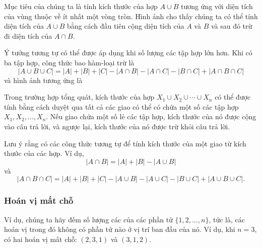 Mục tiêu của chúng ta là tính
kích thước của hợp $A \cup B$
tương ứng với diện tích của vùng
thuộc về ít nhất một vòng tròn.
Hình ảnh cho thấy chúng ta có thể tính
diện tích của $A \cup B$ bằng cách đầu tiên cộng
diện tích của $A$ và $B$ và sau đó trừ đi
diện tích của $A \cap B$.

Ý tưởng tương tự có thể được áp dụng khi số lượng
các tập hợp lớn hơn.
Khi có ba tập hợp, công thức bao hàm-loại trừ là
\[ |A \cup B \cup C| = |A| + |B| + |C| - |A \cap B|  - |A \cap C|  - |B \cap C| + |A \cap B \cap C| \]
và hình ảnh tương ứng là

\begin{center}
\end{center}

Trong trường hợp tổng quát, kích thước của
hợp $X_1 \cup X_2 \cup \cdots \cup X_n$
có thể được tính bằng cách duyệt qua tất cả các
giao có thể có chứa một số các tập hợp $X_1,X_2,\ldots,X_n$.
Nếu giao chứa một số lẻ các tập hợp,
kích thước của nó được cộng vào câu trả lời,
và ngược lại, kích thước của nó được trừ khỏi câu trả lời.

Lưu ý rằng có các công thức tương tự
để tính
kích thước của một giao từ kích thước của
các hợp. Ví dụ,
\[ |A \cap B| = |A| + |B| - |A \cup B|\]
và
\[ |A \cap B \cap C| = |A| + |B| + |C| - |A \cup B|  - |A \cup C|  - |B \cup C| + |A \cup B \cup C| .\]

\subsubsection{Hoán vị mất chỗ}


Ví dụ, chúng ta hãy đếm số lượng các 
của các phần tử $\{1,2,\ldots,n\}$, tức là, các hoán vị
trong đó không có phần tử nào ở vị trí ban đầu của nó.
Ví dụ, khi $n=3$, có
hai hoán vị mất chỗ: $(2,3,1)$ và $(3,1,2)$.

